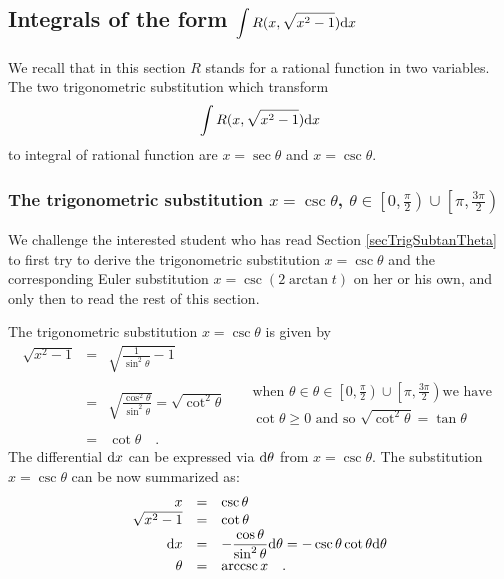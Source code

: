 \documentclass[12pt]{book}
\DeclareMathOperator{\arccsc}{arccsc}
\begin{document}
\subsection{Integrals of the form $\displaystyle \int R(x, \sqrt{x^2 -1}) {\normalfont \text{d}} x$}
We recall that in this section $R$ stands for a rational function in two variables. The two trigonometric substitution which transform
\[
\int R(x, \sqrt{x^2-1}){\normalfont \text{d}} x
\]
to integral of rational function are $x=\sec \theta$ and $x=\csc \theta$.

\subsubsection{The trigonometric substitution $x=\csc \theta$, $\theta \in \left[0, \frac{\pi}{2}\right)\cup \left[\pi, \frac{3\pi}{2}\right) $}
We challenge the interested student who has read Section \ref{secTrigSubtanTheta} to first try to derive the trigonometric substitution $x=\csc \theta$ and the corresponding Euler substitution $x=\csc (2\arctan t)$  on her or his own, and only then to read the rest of this section.

The trigonometric substitution $x=\csc \theta$ is given by
\[
\begin{array}{rcll|l}
\displaystyle \sqrt{x^2-1}&=&\displaystyle \sqrt{\frac{1}{\sin^2\theta}-1}\\
&=&\displaystyle \sqrt{\frac{\cos^2\theta}{\sin^2\theta}}=\sqrt{\cot^2 \theta} &&\begin{array}{l} \text{when }\theta\in \theta \in \left[0, \frac{\pi}{2}\right)\cup \left[\pi, \frac{3\pi}{2}\right) \text{we have}\\
\cot \theta\geq 0 \text{ and so } \sqrt{\cot^2\theta}=\tan \theta
\end{array}  \\
&=&\displaystyle \cot \theta\quad .
\end{array}
\]
The differential ${\normalfont \text{d}} x$ can be expressed via ${\normalfont \text{d}} \theta$ from $x=\csc \theta$. The substitution $x=\csc \theta $ can be now summarized as:
\begin{equation*}
\begin{array}{rcl}
x&=&\displaystyle \csc \theta\\
\sqrt{x^2-1}&=&\displaystyle \cot \theta\\
\diff x&=&\displaystyle  -\frac{\cos \theta }{\sin^2 \theta} \diff \theta = -\csc\theta \cot\theta \diff \theta\\
\theta&=&\displaystyle \arccsc x \quad .
\end{array}
\end{equation*}
\end{document}
